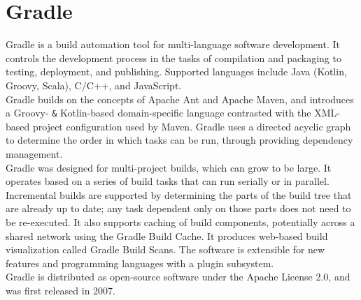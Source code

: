 \newpage

\section{Gradle}

Gradle is a build automation tool for multi-language software development.
It controls the development process in the tasks of compilation and
packaging to testing, deployment, and publishing.
Supported languages include Java (Kotlin, Groovy, Scala),
C/C++, and JavaScript.\\

Gradle builds on the concepts of Apache Ant and
Apache Maven, and introduces a Groovy- \verb|&| Kotlin-based domain-specific
language contrasted with the XML-based project configuration used by
Maven. Gradle uses a directed acyclic graph to determine the order
in which tasks can be run, through providing dependency management.\\

Gradle was designed for multi-project builds, which can grow to be large.
It operates based on a series of build tasks that can run serially or in
parallel. Incremental builds are supported by determining the parts of
the build tree that are already up to date; any task dependent only on
those parts does not need to be re-executed. It also supports caching
of build components, potentially across a shared network using the
Gradle Build Cache. It produces web-based build visualization called
Gradle Build Scans. The software is extensible for new features and
programming languages with a plugin subsystem.\\

Gradle is distributed as open-source software under the Apache License 2.0,
and was first released in 2007.
